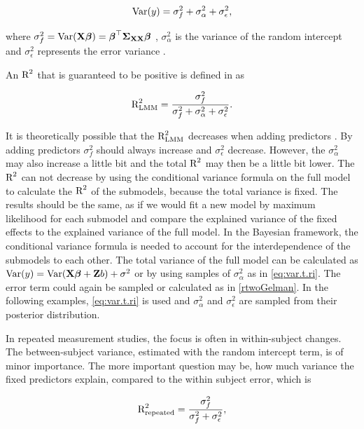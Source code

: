 \documentclass[11pt,a4paper,twoside]{book}
\begin{document}
      \begin{align} 
        \operatorname{Var}(y) = \sigma_{f}^2  + \sigma_{\alpha}^2 + \sigma_{\epsilon}^2, \label{eq:var.t.ri} 
        \end{align}

where $\sigma_{f}^2 = \operatorname{Var}({\mathbf{X}} {\boldsymbol{\beta}}) = {\boldsymbol{\beta}}^\top {\boldsymbol{\Sigma}}{}_{{\mathbf{X}} {\mathbf{X}}}  {\boldsymbol{\beta}}$ , $\sigma_{\alpha}^2 $ is the variance of the random intercept and $\sigma_{\epsilon}^2$ represents the error variance \citep{Nakagawa2013}. 

An $\text{R}^2$ that is guaranteed to be positive is defined in \cite{Nakagawa2013} as

   \begin{align} 
\text{R}^2_{\text{LMM}} = \frac{\sigma_{f}^2}{\sigma_{f}^2 + \sigma_{\alpha}^2 + \sigma_{\epsilon}^2}.
\end{align}


 It is theoretically possible that the $\text{R}^2_{\text{LMM}}$ decreases when adding predictors \citep{Nakagawa2013}.  By adding predictors $\sigma_{f}^2$  should always increase and  $\sigma_{\epsilon}^2$  decrease. However, the $\sigma_{\alpha}^2$ may also increase a little bit and the total $\text{R}^2$ may then be a little bit lower. The $\text{R}^2$ can not decrease by using the conditional variance formula on the full model to calculate the $\text{R}^2$ of the submodels, because the total variance is fixed. The results should be the same, as if we would fit a new model by maximum likelihood for each submodel and  compare the explained variance of the fixed effects to the explained variance of the full model.  In the Bayesian framework, the conditional variance formula is needed to account for the interdependence of the submodels to each other. The total variance of the full model can be calculated as  $\operatorname{Var}(y) = \operatorname{Var}({\mathbf{X}} {\boldsymbol{\beta}} + {\mathbf{Z}} b) + \sigma^2$ or by using samples of $\sigma_{\alpha}^2$ as in \eqref{eq:var.t.ri}. The error term could again be sampled or calculated as in \eqref{rtwoGelman}. In the following examples, \eqref{eq:var.t.ri} is used and  $\sigma_{\alpha}^2$ and $\sigma_{\epsilon}^2$ are sampled from their posterior distribution.

In repeated measurement studies, the focus is often in within-subject changes. The between-subject variance, estimated with the random intercept term, is of minor importance. The more important question may be, how much variance the fixed predictors explain, compared to the within subject error, which is

   \begin{align} 
\text{R}^2_{\text{repeated}} = \frac{\sigma_{f}^2}{\sigma_{f}^2  + \sigma_{\epsilon}^2}, \label{rtwo.repeated}
\end{align}
\end{document}
